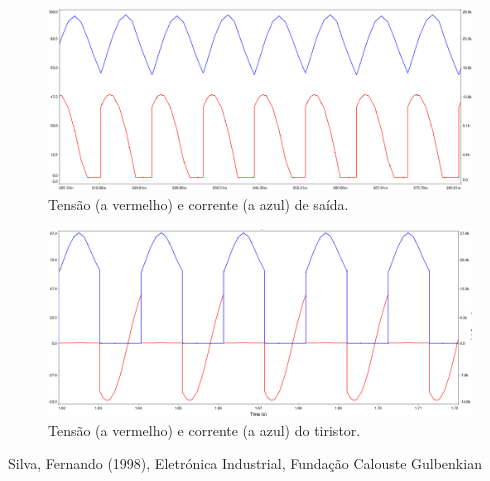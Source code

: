 \documentclass[a4paper,11pt]{article}
\numberwithin{equation}{section}
\begin{document}
\pagebreak
\begin{figure}[h]
	\centering
	\includegraphics[keepaspectratio=true, scale=0.4]{img/circuito10}
	\caption{Tensão (a vermelho) e corrente (a azul) de saída.}
	\label{fig:circuit_12}
	\vspace{-0.8em}
\end{figure}
\vspace{15mm}
\begin{figure}[h]
	\centering
	\includegraphics[keepaspectratio=true, scale=0.4]{img/circuito11}
	\caption{Tensão (a vermelho) e corrente (a azul) do tiristor.}
	\label{fig:circuit_13}
	\vspace{-0.8em}
\end{figure}

\pagebreak

\begin{thebibliography}{2}
	

	
	Silva, Fernando (1998), Eletrónica Industrial, Fundação Calouste Gulbenkian
	
\end{thebibliography}


\pagebreak
\end{document}
